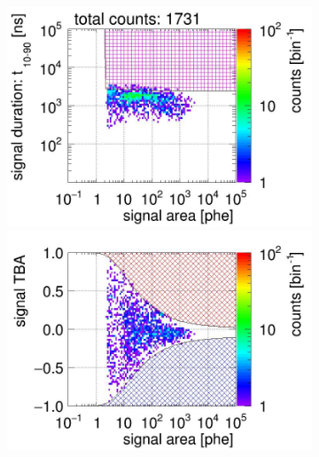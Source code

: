 \begin{landscape}
\begin{figure}[!p]
\begin{subfigure}[t]{0.32\textwidth}
		\caption{}
		\label{fig:signal selection 12}
	\end{subfigure}
	\begin{subfigure}[t]{0.32\textwidth}
		\centering
		\includegraphics[width=\figurewidth,clip,trim={0 98 0 15}]{Figures/GasTest/CutsValid/res64767/pdpa13Vecfig64767.jpg}
		\includegraphics[width=\figurewidth,clip,trim={0 98 0 40}]{Figures/GasTest/CutsValid/res64767/tbapa13Vecfig64767.jpg}

\end{subfigure}
\end{figure}
\end{landscape}
